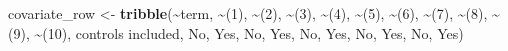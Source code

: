 \documentclass[
]{article}
\newenvironment{Shaded}{\begin{snugshade}}{\end{snugshade}}
\newcommand{\AttributeTok}[1]{\textcolor[rgb]{0.13,0.29,0.53}{#1}}
\newcommand{\FunctionTok}[1]{\textcolor[rgb]{0.13,0.29,0.53}{\textbf{#1}}}
\newcommand{\NormalTok}[1]{#1}
\newcommand{\OtherTok}[1]{\textcolor[rgb]{0.56,0.35,0.01}{#1}}
\newcommand{\SpecialCharTok}[1]{\textcolor[rgb]{0.81,0.36,0.00}{\textbf{#1}}}
\newcommand{\StringTok}[1]{\textcolor[rgb]{0.31,0.60,0.02}{#1}}
\begin{document}
\begin{Shaded}
\begin{Highlighting}[]
\NormalTok{covariate\_row }\OtherTok{\textless{}{-}} \FunctionTok{tribble}\NormalTok{(}\SpecialCharTok{\textasciitilde{}}\NormalTok{term, }\SpecialCharTok{\textasciitilde{}}\StringTok{\textasciigrave{}}\AttributeTok{(1)}\StringTok{\textasciigrave{}}\NormalTok{, }\SpecialCharTok{\textasciitilde{}}\StringTok{\textasciigrave{}}\AttributeTok{(2)}\StringTok{\textasciigrave{}}\NormalTok{, }\SpecialCharTok{\textasciitilde{}}\StringTok{\textasciigrave{}}\AttributeTok{(3)}\StringTok{\textasciigrave{}}\NormalTok{, }\SpecialCharTok{\textasciitilde{}}\StringTok{\textasciigrave{}}\AttributeTok{(4)}\StringTok{\textasciigrave{}}\NormalTok{, }\SpecialCharTok{\textasciitilde{}}\StringTok{\textasciigrave{}}\AttributeTok{(5)}\StringTok{\textasciigrave{}}\NormalTok{, }\SpecialCharTok{\textasciitilde{}}\StringTok{\textasciigrave{}}\AttributeTok{(6)}\StringTok{\textasciigrave{}}\NormalTok{, }\SpecialCharTok{\textasciitilde{}}\StringTok{\textasciigrave{}}\AttributeTok{(7)}\StringTok{\textasciigrave{}}\NormalTok{, }\SpecialCharTok{\textasciitilde{}}\StringTok{\textasciigrave{}}\AttributeTok{(8)}\StringTok{\textasciigrave{}}\NormalTok{, }\SpecialCharTok{\textasciitilde{}}\StringTok{\textasciigrave{}}\AttributeTok{(9)}\StringTok{\textasciigrave{}}\NormalTok{, }\SpecialCharTok{\textasciitilde{}}\StringTok{\textasciigrave{}}\AttributeTok{(10)}\StringTok{\textasciigrave{}}\NormalTok{,}
                \StringTok{\textquotesingle{}controls included\textquotesingle{}}\NormalTok{, }\StringTok{\textquotesingle{}No\textquotesingle{}}\NormalTok{, }\StringTok{\textquotesingle{}Yes\textquotesingle{}}\NormalTok{, }\StringTok{\textquotesingle{}No\textquotesingle{}}\NormalTok{, }\StringTok{\textquotesingle{}Yes\textquotesingle{}}\NormalTok{, }\StringTok{\textquotesingle{}No\textquotesingle{}}\NormalTok{, }\StringTok{\textquotesingle{}Yes\textquotesingle{}}\NormalTok{, }\StringTok{\textquotesingle{}No\textquotesingle{}}\NormalTok{, }\StringTok{\textquotesingle{}Yes\textquotesingle{}}\NormalTok{, }\StringTok{\textquotesingle{}No\textquotesingle{}}\NormalTok{, }\StringTok{\textquotesingle{}Yes\textquotesingle{}}\NormalTok{)}



\end{Highlighting}
\end{Shaded}
\end{document}
